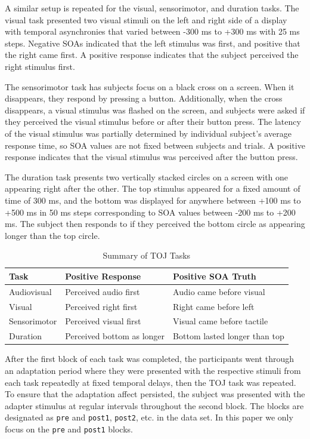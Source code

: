 \documentclass[11pt, oneside, openany]{scrbook}
\begin{document}
A similar setup is repeated for the visual, sensorimotor, and duration tasks. The visual task presented two visual stimuli on the left and right side of a display with temporal asynchronies that varied between -300 ms to +300 ms with 25 ms steps. Negative SOAs indicated that the left stimulus was first, and positive that the right came first. A positive response indicates that the subject perceived the right stimulus first.

The sensorimotor task has subjects focus on a black cross on a screen. When it disappears, they respond by pressing a button. Additionally, when the cross disappears, a visual stimulus was flashed on the screen, and subjects were asked if they perceived the visual stimulus before or after their button press. The latency of the visual stimulus was partially determined by individual subject's average response time, so SOA values are not fixed between subjects and trials. A positive response indicates that the visual stimulus was perceived after the button press.

The duration task presents two vertically stacked circles on a screen with one appearing right after the other. The top stimulus appeared for a fixed amount of time of 300 ms, and the bottom was displayed for anywhere between +100 ms to +500 ms in 50 ms steps corresponding to SOA values between -200 ms to +200 ms. The subject then responds to if they perceived the bottom circle as appearing longer than the top circle.

\begin{table}[!h]

\caption{\label{tab:ch020-toj-summary}Summary of TOJ Tasks}
\centering
\begin{tabular}[t]{lll}
\toprule
Task & Positive Response & Positive SOA Truth\\
\midrule
Audiovisual & Perceived audio first & Audio came before visual\\
Visual & Perceived right first & Right came before left\\
Sensorimotor & Perceived visual first & Visual came before tactile\\
Duration & Perceived bottom as longer & Bottom lasted longer than top\\
\bottomrule
\end{tabular}
\end{table}

After the first block of each task was completed, the participants went through an adaptation period where they were presented with the respective stimuli from each task repeatedly at fixed temporal delays, then the TOJ task was repeated. To ensure that the adaptation affect persisted, the subject was presented with the adapter stimulus at regular intervals throughout the second block. The blocks are designated as \texttt{pre} and \texttt{post1}, \texttt{post2}, etc. in the data set. In this paper we only focus on the \texttt{pre} and \texttt{post1} blocks.
\end{document}
